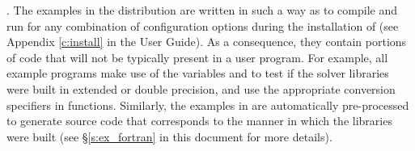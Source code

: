 \vspace{0.2in}. 
The examples in the {\ida} distribution are written in such a way as
to compile and run for any combination of configuration options during the
installation of {\sundials} (see Appendix \ref{c:install} in the User Guide).
As a consequence, they contain portions of code that will not be typically present in a
user program. For example, all example programs make use of the
variables  and 
to test if the solver libraries were built in extended or double precision,
and use the appropriate conversion specifiers in  functions.
Similarly, the {\F} examples in {\fida} are automatically
pre-processed to generate source code that corresponds to the manner
in which the {\ida} libraries were built (see \S\ref{s:ex_fortran} in
this document for more details).
